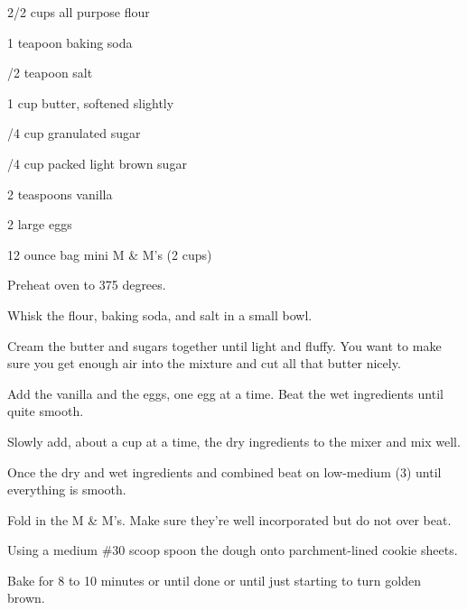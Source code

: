 

\begin{IngredientsAndSteps}
    \ListIngredientsAndSteps
    {
        2/2 cups all purpose flour

        1 teapoon baking soda

        /2 teapoon salt

        \IngredientsSeparatorClear

        1 cup butter, softened slightly

        /4 cup granulated sugar

        /4 cup packed light brown sugar

        \IngredientsSeparatorClear

        2 teaspoons vanilla

        2 large eggs

        12 ounce bag mini M \& M's (2 cups)
    }
    {
        Preheat oven to 375 degrees.

        Whisk the flour, baking soda, and salt in a small bowl.

        Cream the butter and sugars together until light and fluffy. You want to make sure you get
        enough air into the mixture and cut all that butter nicely.

        Add the vanilla and the eggs, one egg at a time. Beat the wet ingredients until quite smooth.

        Slowly add, about a cup at a time, the dry ingredients to the mixer and mix well.

        Once the dry and wet ingredients and combined beat on low-medium (3) until
        everything is smooth.

        Fold in the M \& M's. Make sure they're well incorporated but do not over beat.

        Using a medium \#30 scoop spoon the dough onto parchment-lined cookie sheets.

        Bake for 8 to 10 minutes or until done or until just starting to turn golden brown.
    }
\end{IngredientsAndSteps}


